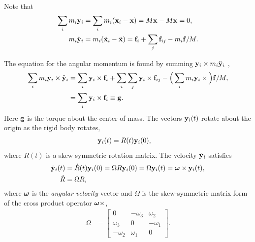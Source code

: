 Note that
\begin{align*}
   \sum_i  m_i \mathbf{ y}_i &= \sum_i m_i (\mathbf{ x}_i -\mathbf{ x}) = M \mathbf{ x} - M \mathbf{ x} = 0,\\
   m_i \ddot {\mathbf{ y}}_i &=  m_i  (\ddot{\mathbf{ x}}_i - \ddot{\mathbf{ x}}) = \mathbf{ f}_i + \sum_j \mathbf{ f}_{ij} - m_i \mathbf{ f}/M .
\end{align*}

The equation for the angular momentum is found by summing $\mathbf{ y}_i\times m_i \ddot {\mathbf{ y}}_i$ ,
\begin{align}
    \sum_i m_i \mathbf{ y}_i\times \ddot {\mathbf{ y}}_i &= \sum_i \mathbf{ y}_i\times \mathbf{ f}_i  + \sum_i\sum_j \mathbf{ y}_i\times\mathbf{ f}_{ij} - \Big( \sum_i m_i \mathbf{ y}_i\times\Big) \mathbf{ f}/M,  \\
                    &= \sum_i \mathbf{ y}_i\times \mathbf{ f}_i \equiv \mathbf{ g} .  \label{eq:yTimesNewton}
\end{align}
Here $\mathbf{ g}$ is the torque about the center of mass.
The vectors $\mathbf{ y}_i(t)$ rotate about the origin as the rigid body rotates, 
\begin{align*}
    \mathbf{ y}_i(t) &= R(t) \mathbf{ y}_i(0),
\end{align*}
where $R(t)$ is a skew symmetric rotation matrix. The velocity $\dot{\mathbf{ y}}_i$ satisfies
\begin{align*}
  \dot{\mathbf{ y}}_i(t) &= \dot R(t) \mathbf{ y}_i(0) = \Omega R \mathbf{ y}_i(0) = \Omega \mathbf{ y}_i(t) = \boldsymbol{\omega}\times\mathbf{ y}_i(t),\\
   \dot R &= \Omega R,
\end{align*}
where $\boldsymbol{\omega}$ is the {\em angular velocity} vector and $\Omega$ is the skew-symmetric matrix form of the cross product operator $\boldsymbol{\omega}\times$,
\begin{align*}
  \Omega & = \begin{bmatrix}
    0 & -\omega_3 & \omega_2 \\
    \omega_3 & 0 & -\omega_1 \\
    - \omega_2 & \omega_1  & 0 
\end{bmatrix} .
\end{align*}

